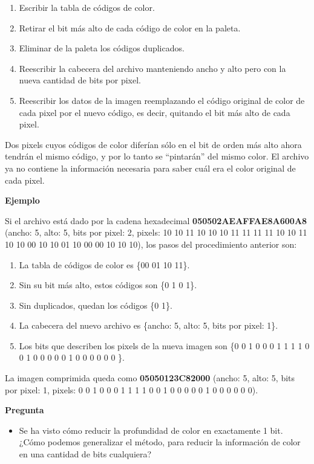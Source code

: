 \documentclass[spanish,A4,]{article}
\begin{document}
\begin{enumerate}
\def\labelenumi{\arabic{enumi}.}
\itemsep1pt\parskip0pt
\item
  Escribir la tabla de códigos de color.
\item
  Retirar el bit más alto de cada código de color en la paleta.
\item
  Eliminar de la paleta los códigos duplicados.
\item
  Reescribir la cabecera del archivo manteniendo ancho y alto pero con
  la nueva cantidad de bits por pixel.
\item
  Reescribir los datos de la imagen reemplazando el código original de
  color de cada pixel por el nuevo código, es decir, quitando el bit más
  alto de cada pixel.
\end{enumerate}

Dos pixels cuyos códigos de color diferían sólo en el bit de orden más
alto ahora tendrán el mismo código, y por lo tanto se ``pintarán'' del
mismo color. El archivo ya no contiene la información necesaria para
saber cuál era el color original de cada pixel.

\textbf{Ejemplo}

Si el archivo está dado por la cadena hexadecimal
\textbf{050502AEAFFAE8A600A8} (ancho: 5, alto: 5, bits por pixel: 2,
pixels: 10 10 11 10 10 10 11 11 11 11 10 10 11 10 10 00 10 10 01 10 00
00 10 10 10), los pasos del procedimiento anterior son:

\begin{enumerate}
\def\labelenumi{\arabic{enumi}.}
\itemsep1pt\parskip0pt
\item
  La tabla de códigos de color es \{00 01 10 11\}.
\item
  Sin su bit más alto, estos códigos son \{0 1 0 1\}.
\item
  Sin duplicados, quedan los códigos \{0 1\}.
\item
  La cabecera del nuevo archivo es \{ancho: 5, alto: 5, bits por pixel:
  1\}.
\item
  Los bits que describen los pixels de la nueva imagen son \{0 0 1 0 0 0
  1 1 1 1 0 0 1 0 0 0 0 0 1 0 0 0 0 0 0 \}.
\end{enumerate}

La imagen comprimida queda como \textbf{05050123C82000} (ancho: 5, alto:
5, bits por pixel: 1, pixels: 0 0 1 0 0 0 1 1 1 1 0 0 1 0 0 0 0 0 1 0 0
0 0 0 0).

\textbf{Pregunta}

\begin{itemize}
\itemsep1pt\parskip0pt
\item
  Se ha visto cómo reducir la profundidad de color en exactamente 1 bit.
  ¿Cómo podemos generalizar el método, para reducir la información de
  color en una cantidad de bits cualquiera?
\end{itemize}
\end{document}
